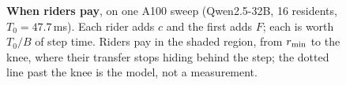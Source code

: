 \begin{figure}[t]
\caption{\textbf{When riders pay}, on one A100 sweep (Qwen2.5-32B, 16
residents, $T_0 = 47.7$\,ms). Each rider adds $c$ and the first adds $F$; each
is worth $T_0/B$ of step time. Riders pay in the shaded region, from
$r_{\min}$ to the knee, where their transfer stops hiding behind the step; the dotted line past the knee is the model,
not a measurement.}
\label{fig:worth}
\end{figure}
